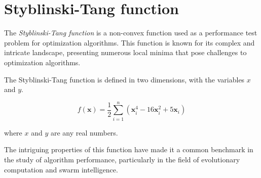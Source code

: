 \section{Styblinski-Tang function}
\label{sec:app:test:styblinski_tang}
  The \emph{Styblinski-Tang function} is a non-convex function used as a 
  performance test problem for optimization algorithms.
  This function is known for its complex and intricate landscape, presenting 
  numerous local minima that pose challenges to optimization algorithms.

  \begin{definition}
  \label{def:app:test:styblinski_tang}
    The Styblinski-Tang function is defined in two dimensions, with the variables \(x\) and \(y\).

    \begin{equation}
      \label{eq:app:test:styblinski_tang}
      f(\mathbf{x}) = \frac{1}{2} \sum_{i=1}^{n} 
        \left(\mathbf{x}_i^4 - 16\mathbf{x}_i^2 + 5\mathbf{x}_i\right) 
    \end{equation}
    
    where \(x\) and \(y\) are any real numbers.
  \end{definition}

  The intriguing properties of this function have made it a common benchmark in the study of algorithm performance, particularly in the field of evolutionary computation and swarm intelligence.

